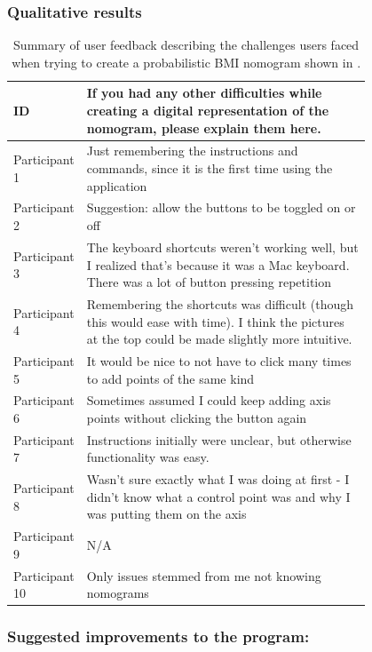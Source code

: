 \documentclass{l4proj}
\begin{document}
\subsubsection{Qualitative results}
\begin{table}
\small
\centering
\begin{tabular}{|l|p{0.8\linewidth}|}
\hline
\textbf{ID} & \textbf{If you had any other difficulties while creating a digital representation of the nomogram, please explain them here.} \\ \hline
Participant 1 & Just remembering the instructions and commands, since it is the first time using the application \\ \hline
Participant 2 & Suggestion: allow the buttons to be toggled on or off \\ \hline
Participant 3 & The keyboard shortcuts weren't working well, but I realized that's because it was a Mac keyboard. There was a lot of button pressing repetition \\ \hline
Participant 4 & Remembering the shortcuts was difficult (though this would ease with time). I think the pictures at the top could be made slightly more intuitive. \\ \hline
Participant 5 & It would be nice to not have to click many times to add points of the same kind \\ \hline
Participant 6 & Sometimes assumed I could keep adding axis points without clicking the button again \\ \hline
Participant 7 & Instructions initially were unclear, but otherwise functionality was easy. \\ \hline
Participant 8 & Wasn't sure exactly what I was doing at first - I didn't know what a control point was and why I was putting them on the axis \\ \hline
Participant 9 & N/A \\ \hline
Participant 10 & Only issues stemmed from me not knowing nomograms \\ \hline
\end{tabular}
\caption{Summary of user feedback describing the challenges users faced when trying to create a probabilistic BMI nomogram shown in .}
\label{fig:quali-eval-results-table}
\end{table}

\subsubsection{Suggested improvements to the program:}
\end{document}
